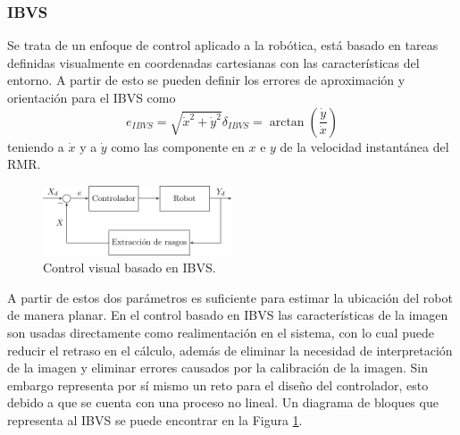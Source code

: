 \subsubsection{IBVS}
Se trata de un enfoque de control aplicado a la robótica, está basado en tareas definidas visualmente en coordenadas cartesianas con las características del entorno. A partir de esto se pueden definir los errores de aproximación y orientación para el IBVS como
\begin{subequations}
	\begin{equation}\label{eq:eibvs}
		e_{IBVS}=\sqrt{\dot{x}^{2}+\dot{y}^2}
	\end{equation}
	\begin{equation}\label{eq:dibvs}
		\delta_{IBVS}=\arctan\left(\frac{\dot{y}}{\dot{x}}\right)
	\end{equation}
\end{subequations} 
teniendo a $\dot{x}$  y a $\dot{y}$ como las componente en $x$ e $y$ de la velocidad instantánea del RMR.
\begin{figure}[htbp!]
	\centering
	\includegraphics[width=0.5\textwidth]{./Figuras/IBVS/IBVS}
	\caption{Control visual basado en IBVS.}
	\label{fig:IBVS}
\end{figure}
\par A partir de estos dos parámetros es suficiente para estimar la ubicación del robot de manera planar. En el control basado en IBVS las características de la imagen son usadas directamente como realimentación en el sistema, con lo cual puede reducir el retraso en el cálculo, además de eliminar la necesidad de interpretación de la imagen y eliminar errores causados por la calibración de la imagen. Sin embargo representa por sí mismo un reto para el diseño del controlador, esto debido a que se cuenta con una proceso no lineal. Un diagrama de bloques que representa al IBVS se puede encontrar en la Figura \ref{fig:IBVS}.
